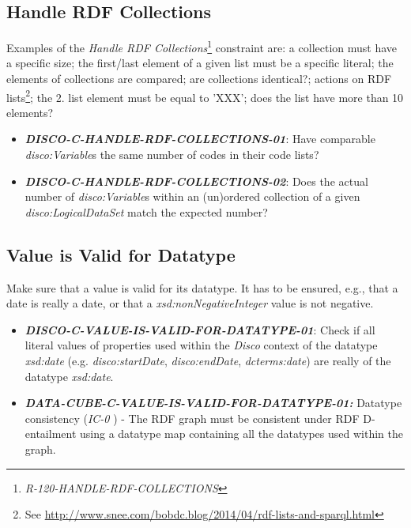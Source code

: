 \documentclass{llncs}
\begin{document}
\subsection{Handle RDF Collections}

Examples of the \emph{Handle RDF Collections}\footnote{\emph{R-120-HANDLE-RDF-COLLECTIONS}} constraint are: a collection must have a specific size; the first/last element of a given list must be a specific literal; the elements of collections are compared; are collections identical?; actions on RDF lists\footnote{See \url{http://www.snee.com/bobdc.blog/2014/04/rdf-lists-and-sparql.html}}; the 2. list element must be equal to 'XXX'; does the list have more than 10 elements?

\begin{itemize}
	\item \textbf{{\em DISCO-C-HANDLE-RDF-COLLECTIONS-01}}: Have comparable \emph{disco:Variable}s the same number of codes in their code lists?
	\item \textbf{{\em DISCO-C-HANDLE-RDF-COLLECTIONS-02}}: Does the actual number of \emph{disco:Variable}s within an (un)ordered collection of a given \emph{disco:LogicalDataSet} match the expected number? 
\end{itemize}

\subsection{Value is Valid for Datatype}

Make sure that a value is valid for its datatype.
It has to be ensured, e.g., that a date is really a date, or that a \emph{xsd:nonNegativeInteger} value is not negative. 

\begin{itemize}
	\item \textbf{{\em DISCO-C-VALUE-IS-VALID-FOR-DATATYPE-01}}: Check if all literal values of properties used within the \emph{Disco} context of the datatype {\em xsd:date} (e.g. {\em disco:startDate}, {\em disco:endDate}, {\em dcterms:date}) are really of the datatype {\em xsd:date}.
\end{itemize}

\begin{itemize}
	\item \textbf{{\em DATA-CUBE-C-VALUE-IS-VALID-FOR-DATATYPE-01:}}
	Datatype consistency (\emph{IC-0} \cite{CyganiakReynolds2014}) -  
	The RDF graph must be consistent under RDF D-entailment using a datatype map containing all the datatypes used within the graph. 
\end{itemize}
\end{document}
